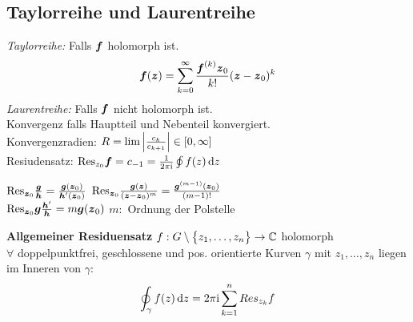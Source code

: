 \documentclass[german,color,5pt]{latex4ei/latex4ei_fs}
\begin{document}
\begin{sectionbox}
	\subsection{Taylorreihe und Laurentreihe}
	\emph{Taylorreihe:} Falls $\boldsymbol{f}$ holomorph ist.
	\begin{equation*}
		\boldsymbol{f}(\boldsymbol{z}) = \sum\limits_{k = 0}^{\infty} \frac{\boldsymbol{f}^{(k)} \boldsymbol{z}_0}{k!} (\boldsymbol{z} - \boldsymbol{z}_0)^k
	\end{equation*}
	\emph{Laurentreihe:} Falls $\boldsymbol{f}$ nicht holomorph ist.\\
	Konvergenz falls Hauptteil und Nebenteil konvergiert. \\ 
	Konvergenzradien: $R = \lim \left\vert\frac{c_k}{c_{k+1}}\right\vert \in [0, \infty]$ \\ 
	Resiudensatz: $\mathrm{Res}_{z_0} \cx f = c_{-1} = \frac{1}{2\pi\i} \oint f(z) \diff z$
	
	\begin{emphbox}
		\raggedright
		$\mathrm{Res}_{\boldsymbol{z}_0} \frac{\boldsymbol{g}}{\boldsymbol{h}} = \frac{\boldsymbol{g}(\boldsymbol{z}_0)}{\boldsymbol{h}'(\boldsymbol{z}_0)}$ \qquad $\mathrm{Res}_{\boldsymbol{z}_0} \frac{\boldsymbol{g}(\boldsymbol{z})}{(\boldsymbol{z} - \boldsymbol{z}_0)^m} = \frac{\boldsymbol{g}^{(m-1)}(\boldsymbol{z}_0)}{(m-1)!}$\\
		$\mathrm{Res}_{\boldsymbol{z}_0} \boldsymbol{g} \frac{\boldsymbol{h}'}{\boldsymbol{h}} = m \boldsymbol{g}(\boldsymbol{z}_0)$ \qquad $m:$ Ordnung der Polstelle
	\end{emphbox}
	\textbf{Allgemeiner Residuensatz} $f:G \setminus \bigl\{z_1, \ldots, z_n\bigr\} \rightarrow \mathbb C$ holomorph \\ 
	$\forall $ doppelpunktfrei, geschlossene und pos. orientierte Kurven $\gamma$ mit $z_1, \dots, z_n$ liegen im Inneren von $\gamma$:
	\begin{equation*}
		\oint_\gamma f(z) \diff z = 2 \pi \i \sum_{k=1}^{n} Res_{z_k} f
	\end{equation*}
\end{sectionbox}
\end{document}
